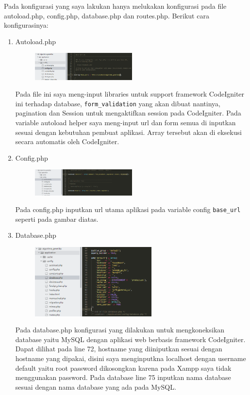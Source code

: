 Pada konfigurasi yang saya lakukan hanya melukakan konfigurasi pada file autoload.php, config.php, database.php dan routes.php. Berikut cara konfigurasinya:
\begin{enumerate}
    \item Autoload.php
		\begin{figure}[!htbp]
    		\centering
    		\includegraphics[width=0.5\textwidth]{figures/CodeIgniter2.PNG}
    		\label{CodeIgniter2}
		\end{figure}
		\par Pada file ini saya meng-input libraries untuk support framework CodeIgniter ini terhadap database, \verb|form_validation| yang akan dibuat nantinya, pagination dan Session untuk mengaktifkan session pada CodeIgniter.
        Pada variable autoload helper saya meng-input url dan form semua di inputkan sesuai dengan kebutuhan pembuat aplikasi. Array tersebut akan di eksekusi secara automatis oleh CodeIgniter.

    \item Config.php
		\begin{figure}[!htbp]
    		\centering
    		\includegraphics[width=0.5\textwidth]{figures/CodeIgniter3.PNG}
    		\label{CodeIgniter3}
		\end{figure}
        \par Pada config.php inputkan url utama aplikasi pada variable config \verb|base_url| seperti pada gambar diatas.
        
    \item Database.php
		\begin{figure}[!htbp]
    		\centering
    		\includegraphics[width=0.6\textwidth]{figures/CodeIgniter4.PNG}
    		\label{CodeIgniter4}
		\end{figure}
		\par Pada database.php konfigurasi yang dilakukan untuk mengkoneksikan database yaitu MySQL dengan aplikasi web berbasis framework CodeIgniter. Dapat dilihat pada line 72, hostname yang diiniputkan sesuai dengan hostname yang dipakai, disini saya menginputkna localhost dengan username default yaitu root password dikosongkan karena pada Xampp saya tidak menggunakan password. Pada database line 75 inputkan nama database sesuai dengan nama database yang ada pada MySQL.
		

\end{enumerate}
